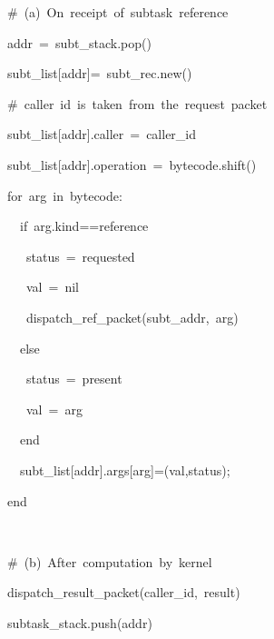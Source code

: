 \documentclass[copyright,creativecommons]{eptcs}
\newenvironment{lyxcode}
{\par\begin{list}{}{
\setlength{\rightmargin}{\leftmargin}
\setlength{\listparindent}{0pt}\raggedright
\setlength{\itemsep}{0pt}
\setlength{\parsep}{0pt}
\normalfont\ttfamily}\item[]}
{\end{list}}
\begin{document}
\begin{algorithm}
\begin{lyxcode}
\medskip{}


\#~(a)~On~receipt~of~subtask~reference

{\small addr~=~subt\_stack.pop()}{\small \par}

{\small subt\_list{[}addr{]}=~subt\_rec.new()}{\small \par}

{\small \#~caller~id~is~taken~from~the~request~packet}{\small \par}

{\small subt\_list{[}addr{]}.caller~=~caller\_id}{\small \par}

{\small subt\_list{[}addr{]}.operation~=~bytecode.shift()}{\small \par}

{\small for~arg~in~bytecode:}{\small \par}

{\small{}~~if~arg.kind==reference}{\small \par}

{\small{}~~~status~=~requested~}{\small \par}

{\small{}~~~val~=~nil}{\small \par}

{\small{}~~~dispatch\_ref\_packet(subt\_addr,~arg)}{\small \par}

{\small{}~~else}{\small \par}

{\small{}~~~status~=~present}{\small \par}

{\small{}~~~val~=~arg~~~}{\small \par}

{\small{}~~end}{\small \par}

{\small{}~~subt\_list{[}addr{]}.args{[}arg{]}=(val,status);}{\small \par}

{\small end}{\small \par}

~

\#~(b)~After~computation~by~kernel

{\small dispatch\_result\_packet(caller\_id,~result)}{\small \par}

{\small subtask\_stack.push(addr)}{\small \par}

\medskip{}

\end{lyxcode}
\caption{\label{alg:Subtask-allocation-and}(a) Subtask allocation and parsing;
(b) Result dispatch and clean-up}
\end{algorithm}
\end{document}
